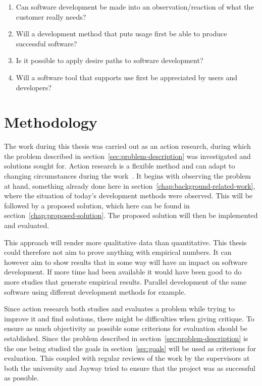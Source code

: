 \documentclass[a4paper]{report}
\begin{document}
\begin{enumerate}
	\item Can software development be made into an observation/reaction of what the customer really needs?
	\item Will a development method that puts usage first be able to produce successful software?
	\item Is it possible to apply desire paths to software development?
	\item Will a software tool that supports use first be appreciated by users and developers?
\end{enumerate}

\section{Methodology}
The work during this thesis was carried out as an action research, during which the problem described in section~\ref{sec:problem-description} was investigated and solutions sought for. Action research is a flexible method and can adapt to changing circumstances during the work~\cite{Host-et-al:2006}. It begins with observing the problem at hand, something already done here in section~\ref{chap:background-related-work}, where the situation of today's development methods were observed. This will be followed by a proposed solution, which here can be found in section~\ref{chap:proposed-solution}. The proposed solution will then be implemented and evaluated.

This approach will render more qualitative data than quantitative. This thesis could therefore not aim to prove anything with empirical numbers. It can however aim to show results that in some way will have an impact on software development. If more time had been available it would have been good to do more studies that generate empirical results. Parallel development of the same software using different development methods for example.

Since action research both studies and evaluates a problem while trying to improve it and find solutions, there might be difficulties when giving critique. To ensure as much objectivity as possible some criterions for evaluation should be  established. Since the problem described in section~\ref{sec:problem-description} is the one being studied the goals in section~\ref{sec:goals} will be used as criterions for evaluation. This coupled with regular reviews of the work by the supervisors at both the university and Jayway tried to ensure that the project was as successful as possible.
\end{document}
